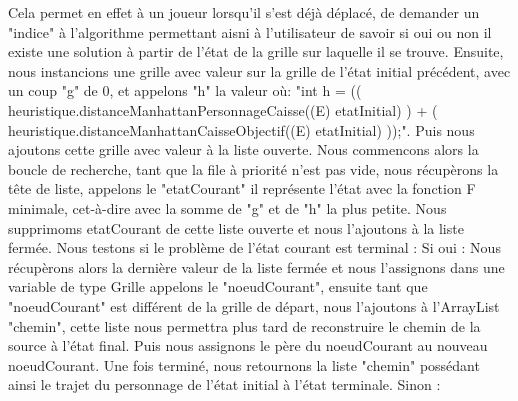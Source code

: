 \documentclass[a4paper,12pt]{article} %
\begin{document}
\newline\newline
Cela permet en effet à un joueur lorsqu’il s’est déjà déplacé, de demander un "indice" à l’algorithme permettant aisni à l’utilisateur de savoir si oui ou non il existe une solution à partir de l’état de la grille sur laquelle il se trouve. 
\newline\newline	
Ensuite, nous instancions une grille avec valeur sur la grille de l’état initial précédent, avec un coup "g" de 0, et appelons "h" la valeur où: 
\newline\newline
"int h = (( heuristique.distanceManhattanPersonnageCaisse((E) etatInitial) ) 
\newline
+ ( heuristique.distanceManhattanCaisseObjectif((E) etatInitial) ));".
\newline\newline
Puis nous ajoutons cette grille avec valeur à la liste ouverte.
\newline\newline
Nous commencons alors la boucle de recherche, tant que la file à priorité n’est pas vide, nous récupèrons la tête de liste, appelons le "etatCourant" il représente l’état avec la fonction F minimale, cet-à-dire avec la somme de "g" et de "h" la plus petite.
\newline\newline
Nous supprimoms etatCourant de cette liste ouverte et nous l’ajoutons à la liste fermée.
\newpage
\noindent
Nous testons si le problème de l’état courant est terminal :
\newline\newline
Si oui : 
\newline\newline
Nous récupèrons alors la dernière valeur de la liste fermée et nous l’assignons dans une variable de type Grille appelons le "noeudCourant", ensuite tant que "noeudCourant" est différent de la grille de départ, nous l’ajoutons à l’ArrayList "chemin", cette liste nous permettra plus tard de reconstruire le chemin de la source à l’état final. Puis nous assignons le père du noeudCourant au nouveau noeudCourant. Une fois terminé, nous retournons la liste "chemin" possédant ainsi le trajet du personnage de l'état initial à l'état terminale.
\newline\newline
Sinon :
\newline\newline 
\end{document}
